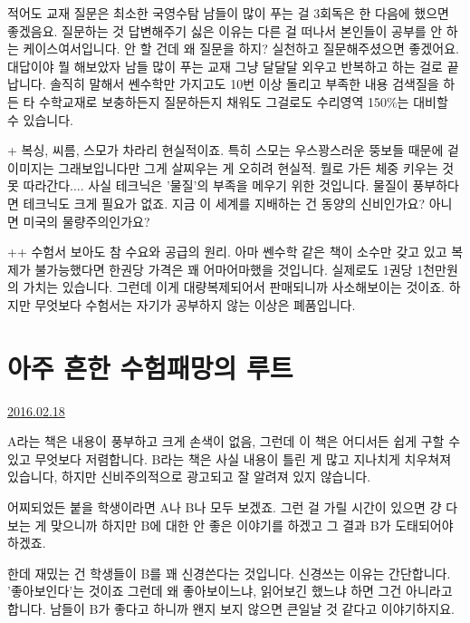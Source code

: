 적어도 교재 질문은 최소한 국영수탐 남들이 많이 푸는 걸 3회독은 한 다음에 했으면 좋겠음요.
질문하는 것 답변해주기 싫은 이유는 다른 걸 떠나서 본인들이 공부를 안 하는 케이스여서입니다. 안 할 건데 왜 질문을 하지?
실천하고 질문해주셨으면 좋겠어요.
대답이야 뭘 해보았자 남들 많이 푸는 교재 그냥 달달달 외우고 반복하고 하는 걸로 끝납니다.
솔직히 말해서 쎈수학만 가지고도 10번 이상 돌리고 부족한 내용 검색질을 하든 타 수학교재로 보충하든지 질문하든지 채워도
그걸로도 수리영역 150$\%$는 대비할 수 있습니다.
\vspace{5mm}

+
복싱, 씨름, 스모가 차라리 현실적이죠.
특히 스모는 우스꽝스러운 뚱보들 때문에 겉이미지는 그래보입니다만
그게 살찌우는 게 오히려 현실적. 뭘로 가든 체중 키우는 것 못 따라간다....
사실 테크닉은 '물질'의 부족을 메우기 위한 것입니다. 물질이 풍부하다면 테크닉도 크게 필요가 없죠.
지금 이 세계를 지배하는 건 동양의 신비인가요? 아니면 미국의 물량주의인가요?
\vspace{5mm}

++
수험서 보아도 참 수요와 공급의 원리.
아마 쎈수학 같은 책이 소수만 갖고 있고 복제가 불가능했다면 한권당 가격은 꽤 어마어마했을 것입니다.
실제로도 1권당 1천만원의 가치는 있습니다. 그런데 이게 대량복제되어서 판매되니까 사소해보이는 것이죠.
하지만 무엇보다 수험서는 자기가 공부하지 않는 이상은 폐품입니다.
\vspace{5mm}






\section{아주 흔한 수험패망의 루트}
\href{https://www.kockoc.com/Apoc/640984}{2016.02.18}

\vspace{5mm}

A라는 책은 내용이 풍부하고 크게 손색이 없음,  그런데 이 책은 어디서든 쉽게 구할 수 있고 무엇보다 저렴합니다.
B라는 책은 사실 내용이 틀린 게 많고 지나치게 치우쳐져 있습니다, 하지만 신비주의적으로 광고되고 잘 알려져 있지 않습니다.
\vspace{5mm}

어찌되었든 붙을 학생이라면 A나 B나 모두 보겠죠. 그런 걸 가릴 시간이 있으면 걍 다 보는 게 맞으니까
하지만 B에 대한 안 좋은 이야기를 하겠고 그 결과 B가 도태되어야하겠죠.
\vspace{5mm}

한데 재밌는 건 학생들이 B를 꽤 신경쓴다는 것입니다.
신경쓰는 이유는 간단합니다. '좋아보인다'는 것이죠
그런데 왜 좋아보이느냐, 읽어보긴 했느냐 하면 그건 아니라고 합니다.
남들이 B가 좋다고 하니까 왠지 보지 않으면 큰일날 것 같다고 이야기하지요.
\vspace{5mm}

